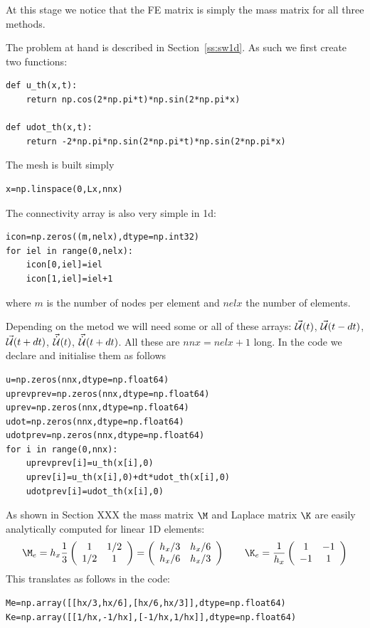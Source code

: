 At this stage we notice that the FE matrix is simply the 
mass matrix for all three methods. 




The problem at hand is described in Section~\ref{ss:sw1d}.
As such we first create two functions:

\begin{lstlisting}
def u_th(x,t):
    return np.cos(2*np.pi*t)*np.sin(2*np.pi*x)

def udot_th(x,t):
    return -2*np.pi*np.sin(2*np.pi*t)*np.sin(2*np.pi*x)
\end{lstlisting}

The mesh is built simply
\begin{lstlisting}
x=np.linspace(0,Lx,nnx)
\end{lstlisting}
The connectivity array is also very simple in 1d:
\begin{lstlisting}
icon=np.zeros((m,nelx),dtype=np.int32)
for iel in range(0,nelx):
    icon[0,iel]=iel
    icon[1,iel]=iel+1
\end{lstlisting}
where $m$ is the number of nodes per element and $nelx$ the number of elements.

Depending on the metod we will need some or all of these arrays:
$\vec{\cal U}(t)$, $\vec{\cal U}(t-dt)$, $\vec{\cal U}(t+dt)$, $\vec{\dot{{\cal U}}}(t)$, $\vec{\dot{{\cal U}}}(t+dt)$.
All these are $nnx=nelx+1$ long. 
In the code we declare and initialise them as follows 
\begin{lstlisting}
u=np.zeros(nnx,dtype=np.float64)    
uprevprev=np.zeros(nnx,dtype=np.float64) 
uprev=np.zeros(nnx,dtype=np.float64)    
udot=np.zeros(nnx,dtype=np.float64)    
udotprev=np.zeros(nnx,dtype=np.float64) 
for i in range(0,nnx):
    uprevprev[i]=u_th(x[i],0)
    uprev[i]=u_th(x[i],0)+dt*udot_th(x[i],0)
    udotprev[i]=udot_th(x[i],0)
\end{lstlisting}




As shown in Section XXX the mass matrix $\M$ and Laplace matrix $\K$ are 
easily analytically computed for linear 1D elements:
\[
\M_e=
h_x\frac{1}{3}
\left(
\begin{array}{cc}
1 & 1/2 \\ 1/2 & 1
\end{array}
\right)
=
\left(
\begin{array}{cc}
h_x/3 & h_x/6 \\ h_x/6 & h_x/3
\end{array}
\right)
\qquad
\K_e=
\frac{1}{h_x}
\left(
\begin{array}{cc}
1 & -1 \\ -1 & 1
\end{array}
\right)
\]
This translates as follows in the code:
\begin{lstlisting}
Me=np.array([[hx/3,hx/6],[hx/6,hx/3]],dtype=np.float64)
Ke=np.array([[1/hx,-1/hx],[-1/hx,1/hx]],dtype=np.float64)
\end{lstlisting}

